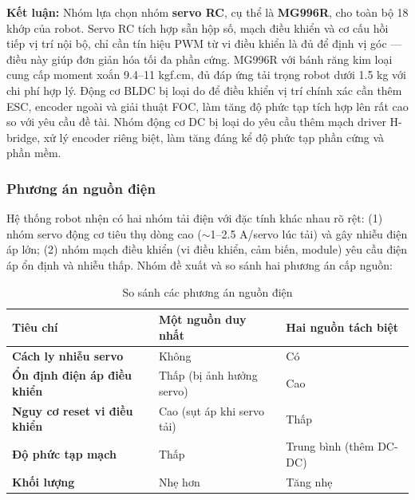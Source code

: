             \textbf{Kết luận:} Nhóm lựa chọn nhóm \textbf{servo RC}, cụ thể là \textbf{MG996R}, cho toàn bộ 18 khớp của robot. Servo RC tích hợp sẵn hộp số, mạch điều khiển và cơ cấu hồi tiếp vị trí nội bộ, chỉ cần tín hiệu PWM từ vi điều khiển là đủ để định vị góc — điều này giúp đơn giản hóa tối đa phần cứng. MG996R với bánh răng kim loại cung cấp moment xoắn 9.4--11 kgf.cm, đủ đáp ứng tải trọng robot dưới 1.5 kg với chi phí hợp lý. Động cơ BLDC bị loại do để điều khiển vị trí chính xác cần thêm ESC, encoder ngoài và giải thuật FOC, làm tăng độ phức tạp tích hợp lên rất cao so với yêu cầu đề tài. Nhóm động cơ DC bị loại do yêu cầu thêm mạch driver H-bridge, xử lý encoder riêng biệt, làm tăng đáng kể độ phức tạp phần cứng và phần mềm.

                        \subsubsection{Phương án nguồn điện}

            \hspace{0.5cm} Hệ thống robot nhện có hai nhóm tải điện với đặc tính khác nhau rõ rệt: (1) nhóm servo động cơ tiêu thụ dòng cao ($\sim$1--2.5 A/servo lúc tải) và gây nhiễu điện áp lớn; (2) nhóm mạch điều khiển (vi điều khiển, cảm biến, module) yêu cầu điện áp ổn định và nhiễu thấp. Nhóm đề xuất và so sánh hai phương án cấp nguồn:

            \begin{table}[h!]
            \centering
            \caption{So sánh các phương án nguồn điện}
            \label{tab:power_options}
            \begin{tabular}{|>{\centering\arraybackslash}m{3cm}|>{\centering\arraybackslash}m{5.5cm}|>{\centering\arraybackslash}m{5.5cm}|}
            \hline
            \textbf{Tiêu chí} & \textbf{Một nguồn duy nhất} & \textbf{Hai nguồn tách biệt} \\
            \hline
            \textbf{Cách ly nhiễu servo} & Không & Có \\
            \hline
            \textbf{Ổn định điện áp điều khiển} & Thấp (bị ảnh hưởng servo) & Cao \\
            \hline
            \textbf{Nguy cơ reset vi điều khiển} & Cao (sụt áp khi servo tải) & Thấp \\
            \hline
            \textbf{Độ phức tạp mạch} & Thấp & Trung bình (thêm DC-DC) \\
            \hline
            \textbf{Khối lượng} & Nhẹ hơn & Tăng nhẹ \\
            \hline
            \end{tabular}
            \end{table}

